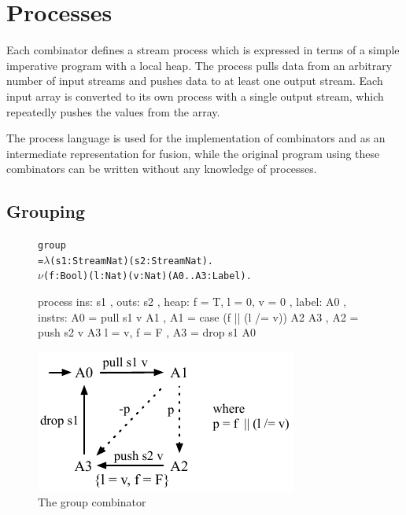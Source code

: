 \section{Processes}
\label{s:Processes}

Each combinator defines a stream process which is expressed in terms of a simple imperative program with a local heap.
The process pulls data from an arbitrary number of input streams and pushes data to at least one output stream.
Each input array is converted to its own process with a single output stream, which repeatedly pushes the values from the array.

The process language is used for the implementation of combinators and as an intermediate representation for fusion, while the original program using these combinators can be written without any knowledge of processes.


\subsection{Grouping}
\begin{figure}

\begin{center}
\begin{alltt}
           group 
             = \(\lambda\) (s1: Stream Nat) (s2: Stream Nat). 
               \(\nu\) (f: Bool) (l: Nat) (v: Nat) (A0..A3: Label).
\end{alltt}
\begin{code}
               process
               { ins:    { s1 }
               , outs:   { s2 }
               , heap:   { f = T, l = 0, v = 0 }
               , label:  A0
               , instrs: { A0 = pull s1 v            A1 {}
                         , A1 = case (f || (l /= v)) A2 {}  A3 {}
                         , A2 = push s2 v            A3 { l = v, f = F }
                         , A3 = drop s1              A0 {} } }
\end{code}
\end{center}
\vspace{1em}
\includegraphics[scale=1.1]{figures/state-group.pdf}
\caption{The group combinator}
\label{fig:Process:Group}
\end{figure}

